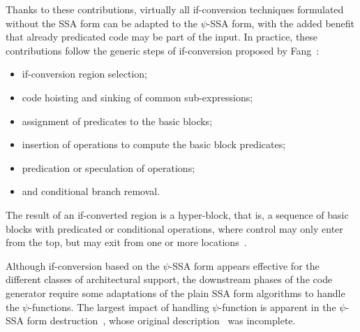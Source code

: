 Thanks to these contributions, virtually all if-conversion techniques formulated
without the SSA form can be adapted to the $\psi$-SSA form, with the added
benefit that already predicated code may be part of the input. In practice, these
contributions follow the generic steps of if-conversion proposed by Fang~\cite{Fang:1996:LCPC}:
\begin{itemize}
\item if-conversion region selection;
\item code hoisting and sinking of common sub-expressions;
\item assignment of predicates to the basic blocks;
\item insertion of operations to compute the basic block predicates;
\item predication or speculation of operations;
\item and conditional branch removal.
\end{itemize}
The result of an if-converted region is a hyper-block, that is, a sequence of
basic blocks with predicated or conditional operations, where control may only
enter from the top, but may exit from one or more locations~\cite{Mahlke:1992:MICRO}.

\medskip
Although if-conversion based on the $\psi$-SSA form appears effective for the
different classes of architectural support, the downstream phases of the code
generator require some adaptations of the plain SSA form algorithms to
handle the $\psi$-functions. The largest impact of handling $\psi$-function is
apparent in the $\psi$-SSA form destruction~\cite{Ferriere:2007:SCOPES}, whose
original description~\cite{Stoutchinin:2001:MICRO} was incomplete.


